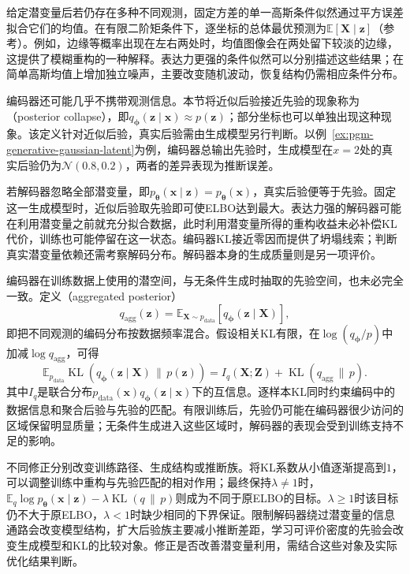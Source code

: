 给定潜变量后若仍存在多种不同观测，固定方差的单一高斯条件似然通过平方误差拟合它们的均值。在有限二阶矩条件下，逐坐标的总体最优预测为$\mathbb E[\bm X\mid\bm z]$（参考）。例如，边缘等概率出现在左右两处时，均值图像会在两处留下较淡的边缘，这提供了模糊重构的一种解释。表达力更强的条件似然可以分别描述这些结果；在简单高斯均值上增加独立噪声，主要改变随机波动，恢复结构仍需相应条件分布。

编码器还可能几乎不携带观测信息。本节将近似后验接近先验的现象称为（posterior collapse），即$q_{\bm{\phi}}(\bm{z}\mid\bm{x})\approx p(\bm{z})$；部分坐标也可以单独出现这种现象。该定义针对近似后验，真实后验需由生成模型另行判断。以例~\ref{ex:pgm-generative-gaussian-latent}为例，编码器总输出先验时，生成模型在$x=2$处的真实后验仍为$\mathcal{N}(0.8,0.2)$，两者的差异表现为推断误差。

若解码器忽略全部潜变量，即$p_{\bm{\theta}}(\bm{x}\mid\bm{z})=p_{\bm{\theta}}(\bm{x})$，真实后验便等于先验。固定这一生成模型时，近似后验取先验即可使ELBO达到最大。表达力强的解码器可能在利用潜变量之前就充分拟合数据，此时利用潜变量所得的重构收益未必补偿KL代价，训练也可能停留在这一状态。编码器KL接近零因而提供了坍塌线索；判断真实潜变量依赖还需考察解码分布。解码器本身的生成质量则是另一项评价。

编码器在训练数据上使用的潜空间，与无条件生成时抽取的先验空间，也未必完全一致。定义（aggregated posterior）
\begin{equation}
  \label{eq:pgm-generative-aggregated-posterior}
  q_{\mathrm{agg}}(\bm{z})
  =\mathbb{E}_{\bm{X}\sim p_{\mathrm{data}}}
       [q_{\bm{\phi}}(\bm{z}\mid\bm{X})],
\end{equation}
即把不同观测的编码分布按数据频率混合。假设相关KL有限，在$\log(q_{\bm{\phi}}/p)$中加减$\log q_{\mathrm{agg}}$，可得
\begin{equation}
  \label{eq:pgm-generative-kl-information}
  \mathbb{E}_{p_{\mathrm{data}}}
    \operatorname{KL}(q_{\bm{\phi}}(\bm{z}\mid\bm{X})\,\|\,p(\bm{z}))
  =I_q(\bm{X};\bm{Z})+
    \operatorname{KL}(q_{\mathrm{agg}}\,\|\,p).
\end{equation}
其中$I_q$是联合分布$p_{\mathrm{data}}(\bm{x})q_{\bm{\phi}}(\bm{z}\mid\bm{x})$下的互信息。逐样本KL同时约束编码中的数据信息和聚合后验与先验的匹配。有限训练后，先验仍可能在编码器很少访问的区域保留明显质量；无条件生成进入这些区域时，解码器的表现会受到训练支持不足的影响。

不同修正分别改变训练路径、生成结构或推断族。将KL系数从小值逐渐提高到$1$，可以调整训练中重构与先验匹配的相对作用；最终保持$\lambda\ne1$时，$\mathbb{E}_q\log p_{\bm{\theta}}(\bm{x}\mid\bm{z})-\lambda \operatorname{KL}(q\,\|\,p)$则成为不同于原ELBO的目标。$\lambda\geq1$时该目标仍不大于原ELBO，$\lambda<1$时缺少相同的下界保证。限制解码器绕过潜变量的信息通路会改变模型结构，扩大后验族主要减小推断差距，学习可评价密度的先验会改变生成模型和KL的比较对象。修正是否改善潜变量利用，需结合这些对象及实际优化结果判断。

